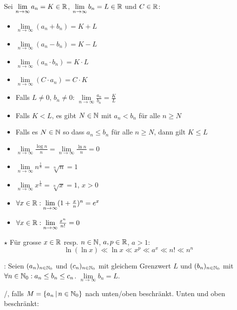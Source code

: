 \Satz Sei $\lim\limits_{n\to\infty} a_n = K \in \mathbb{R}$,
$\lim\limits_{n\to\infty} b_n = L \in \mathbb{R}$ und $C \in \mathbb{R}$:
\vspace{-0.6em}
\begin{itemize}
    \item $\lim\limits_{n\to\infty}(a_n + b_n) = K + L$
    \item $\lim\limits_{n\to\infty}(a_n - b_n) = K - L$
    \item $\lim\limits_{n\to\infty}(a_n \cdot b_n) = K \cdot L$
    \item $\lim\limits_{n\to\infty}(C \cdot a_n) = C \cdot K$
    \item Falls $L\ne 0$, $b_n\ne 0$: $\lim\limits_{n\to\infty}\frac{a_n}{b_n} = \frac{K}{L}$
    \item Falls $K < L$, es gibt $N \in \mathbb{N}$ mit $a_n < b_n$ für alle $n\ge N$
    \item Falls es $N \in \mathbb{N}$ so dass $a_n\le b_n$ für alle $n\ge N$, dann gilt $K\le L$
\end{itemize}

\Satz {}
\vspace{-0.6em}
\begin{itemize}
    \item $\lim\limits_{n\to\infty} \frac{\log n}{n} = \lim\limits_{n\to\infty} \frac{\ln n}{n} =0$
    \item $\lim\limits_{n\to\infty} n^\frac{1}{n} = \sqrt[n]{n} = 1$
    \item $\lim\limits_{n\to\infty} x^\frac{1}{n} = \sqrt[n]{x} = 1$, $x > 0$
    \item $\forall x \in \mathbb{R} : \lim\limits_{n\to\infty} (1 + \frac{x}{n})^n = e^x$
    \item $\forall x \in \mathbb{R} : \lim\limits_{n\to\infty} \frac{x^n}{n!} = 0$
\end{itemize}

\Satz $\star$ Für grosse $x \in \mathbb{R}$ resp. $n \in \mathbb{N}$, $a, p \in \mathbb{R}$, $a > 1$:
$$\ln(\ln x) \ll \ln x \ll x^p \ll a^x \ll n! \ll n^n$$

\Satz {}:
Seien $(a_n)_{n\in\mathbb{N}_0}$ und $(c_n)_{n\in\mathbb{N}_0}$ mit gleichem Grenzwert $L$ und
$(b_n)_{n\in\mathbb{N}_0}$ mit $\forall n \in \mathbb{N}_0 : a_n\le b_n\le c_n$. $\lim\limits_{n\to\infty} b_n = L$.

\Def {}/, falls $M = \{a_n \, | \, n \in \mathbb{N}_0\}$
nach unten/oben beschränkt. Unten und oben beschränkt: 

